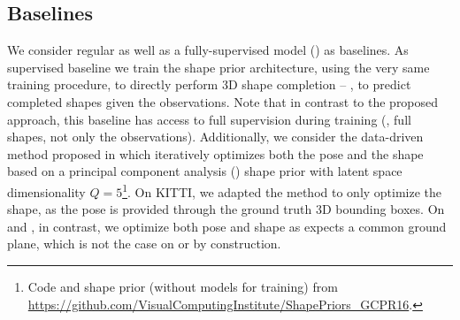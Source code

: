 \subsection{Baselines}

We consider regular \ML as well as a fully-supervised model (\Sup) as baselines.
As supervised baseline we train the \VAE shape prior architecture, using the very same training procedure, to directly perform 3D shape completion -- \ie, to predict completed shapes given the observations. Note that in contrast to the proposed approach, this baseline has access to full supervision during training (\ie, full shapes, not only the observations).  Additionally, we consider the data-driven method proposed in \cite{Engelmann2016GCPR} which iteratively optimizes both the pose and the shape based on a principal component analysis (\PCA) shape prior with latent space dimensionality $Q = 5$\footnote{Code and shape prior (without models for training) from \url{https://github.com/VisualComputingInstitute/ShapePriors_GCPR16}.}. On KITTI, we adapted the method to only optimize the shape, as the pose is provided through the ground truth 3D bounding boxes. On \clean and \noisy, in contrast, we optimize both pose and shape as \cite{Engelmann2016GCPR} expects a common ground plane, which is not the case on \clean or \noisy by construction.




